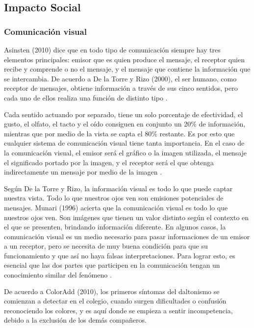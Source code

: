 \documentclass[10pt]{article}
\begin{document}
\subsection{Impacto Social}
\subsubsection{Comunicación visual}
Asinsten (2010) dice que en todo tipo de comunicación siempre hay tres elementos principales: emisor que es quien produce el mensaje, el receptor quien recibe y comprende o no el mensaje, y el mensaje que contiene la información que se intercambia. De acuerdo a De la Torre y Rizo (2000), el ser humano, como receptor de mensajes, obtiene información a través de sus cinco sentidos, pero cada uno de ellos realiza una función de distinto tipo \cite{IEEEreferencias:Ref32}.

Cada sentido actuando por separado, tiene un solo porcentaje de efectividad, el gusto, el olfato, el tacto y el oído consiguen en conjunto un 20\% de información, mientras que por medio de la vista se capta el 80\% restante. Es por esto que cualquier sistema de comunicación visual tiene tanta importancia. En el caso de la comunicación visual, el emisor será el gráfico o la imagen utilizada, el mensaje el significado portado por la imagen, y el receptor será el que obtenga indirectamente un mensaje por medio de la imagen \cite{IEEEreferencias:Ref32}.

Según De la Torre y Rizo, la información visual es todo lo que puede captar nuestra vista. Todo lo que nuestros ojos ven son emisiones potenciales de mensajes. Munari (1996) acierta que la comunicación visual es todo lo que nuestros ojos ven. Son imágenes que tienen un valor distinto según el contexto en el que se presenten, brindando información diferente. En algunos casos, la comunicación visual es un medio necesario para pasar informaciones de un emisor a un receptor, pero se necesita de muy buena condición para que su funcionamiento y que así no haya falsas interpretaciones. Para lograr esto, es esencial que las dos partes que participen en la comunicación tengan un conocimiento similar del fenómeno \cite{IEEEreferencias:Ref32}.

De acuerdo a ColorAdd (2010), los primeros síntomas del daltonismo se comienzan a detectar en el colegio, cuando surgen dificultades o confusión reconociendo los colores, y es aquí donde se empieza a sentir incompetencia, debido a la exclusión de los demás compañeros\cite{IEEEreferencias:Ref32}.
\end{document}
